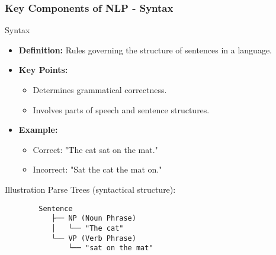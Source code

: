 \documentclass{beamer}
\begin{document}
\begin{frame}[fragile]
    \frametitle{Key Components of NLP - Syntax}
    \begin{block}{Syntax}
        \begin{itemize}
            \item \textbf{Definition:} Rules governing the structure of sentences in a language.
            \item \textbf{Key Points:}
                \begin{itemize}
                    \item Determines grammatical correctness.
                    \item Involves parts of speech and sentence structures.
                \end{itemize}
            \item \textbf{Example:}
                \begin{itemize}
                    \item Correct: "The cat sat on the mat."
                    \item Incorrect: "Sat the cat the mat on."
                \end{itemize}
        \end{itemize}
    \end{block}
    \begin{block}{Illustration}
        Parse Trees (syntactical structure):
        \begin{verbatim}
        Sentence
           ├── NP (Noun Phrase)
           │   └── "The cat"
           └── VP (Verb Phrase)
               └── "sat on the mat"
        \end{verbatim}
    \end{block}
\end{frame}
\end{document}
